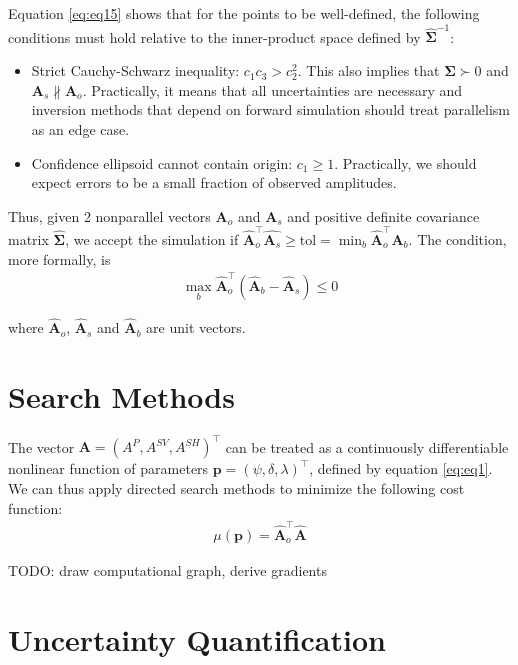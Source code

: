 \documentclass[preprint]{seismica}
\begin{document}
    Equation \ref{eq:eq15} shows that for the points to be well-defined, the following conditions
    must hold relative to the inner-product space defined by $\hat{\bm{\Sigma}}^{-1}$:
    
    \begin{itemize}
      \item Strict Cauchy-Schwarz inequality: $c_1c_3 > c_2^2$. This also implies that
        $\hat{\bm{\Sigma}} \succ 0$ and $\bm{A}_s \nparallel \bm{A}_o$. Practically, it means that all
        uncertainties are necessary and inversion methods that depend on forward simulation should
        treat parallelism as an edge case.
      \item Confidence ellipsoid cannot contain origin: $c_1 \geq 1$. Practically, we should expect
      errors to be a small fraction of observed amplitudes.
    \end{itemize}

    Thus, given 2 nonparallel vectors $\bm{A}_o$ and $\bm{A}_s$ and positive definite covariance
    matrix $\hat{\bm{\Sigma}}$, we accept the simulation if $\hat{\bm{A}}_o^\top \hat{\bm{A}_s} \geq \text{tol} 
    = \min_b \hat{\bm{A}}_o^\top \hat{\bm{A}_b}$. The condition, more formally, is
    \begin{align} \label{eq:eq16}
      \max_b \hat{\bm{A}}_o^\top (\hat{\bm{A}}_b - \hat{\bm{A}}_s) \leq 0
    \end{align}

    \noindent where $\hat{\bm{A}}_o$, $\hat{\bm{A}}_s$ and $\hat{\bm{A}}_b$ are unit vectors.


\section{Search Methods} \label{sec:algorithms}

    The vector $\bm{A} = (A^P, A^{SV}, A^{SH})^\top$ can be treated as a continuously differentiable nonlinear function of
    parameters $\bm{p} = (\psi, \delta, \lambda)^\top$, defined by equation \ref{eq:eq1}. We can thus apply
    directed search methods to minimize the following cost function:
    \begin{align} \label{eq:eq17}
      \mu(\bm{p}) = \hat{\bm{A}}_o^\top \hat{\bm{A}}
    \end{align}

    TODO: draw computational graph, derive gradients

\section{Uncertainty Quantification} \label{sec:uncertainty}
\end{document}
